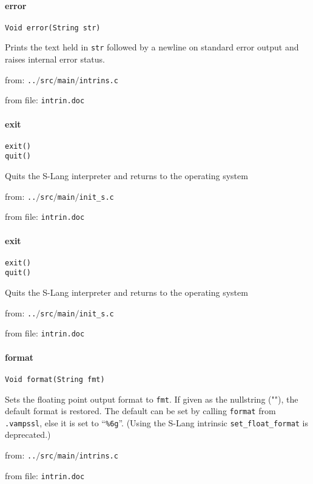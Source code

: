 \paragraph{error}
\begin{verbatim}
Void error(String str)
\end{verbatim}
Prints the text held in {\tt str} followed by a newline on standard
error output and raises internal error status.


from: {\tt ..$/$src$/$main$/$intrins.c}

from file: {\tt intrin.doc}


\paragraph{exit}
\begin{verbatim}
exit()
quit()
\end{verbatim}
Quits the S-Lang interpreter and returns to the
operating system 


from: {\tt ..$/$src$/$main$/$init\_s.c}

from file: {\tt intrin.doc}


\paragraph{exit}
\begin{verbatim}
exit()
quit()
\end{verbatim}
Quits the S-Lang interpreter and returns to the
operating system 


from: {\tt ..$/$src$/$main$/$init\_s.c}

from file: {\tt intrin.doc}


\paragraph{format}
\begin{verbatim}
Void format(String fmt)
\end{verbatim}
Sets the floating point output format to {\tt fmt}. If given
as the nullstring (""), the default format is restored.
The default can be set by calling {\tt format} from {\tt .vampssl},
else it is set to ``{\tt \%6g}''. (Using the S-Lang intrinsic
{\tt set\_float\_format} is deprecated.)


from: {\tt ..$/$src$/$main$/$intrins.c}

from file: {\tt intrin.doc}


